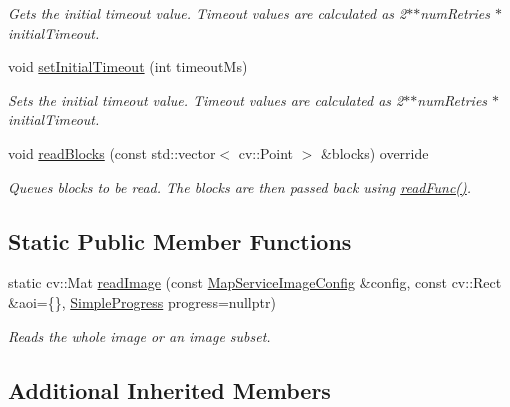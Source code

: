 \begin{DoxyCompactItemize}
\begin{DoxyCompactList}\small\item\em Gets the initial timeout value. Timeout values are calculated as 2$\ast$$\ast$num\+Retries $\ast$ initial\+Timeout. \end{DoxyCompactList}\item 
void \hyperlink{classdg_1_1deepcore_1_1imagery_1_1_map_service_image_a0335fe1cbdde4b7329edafeb29c43b1c}{set\+Initial\+Timeout} (int timeout\+Ms)
\begin{DoxyCompactList}\small\item\em Sets the initial timeout value. Timeout values are calculated as 2$\ast$$\ast$num\+Retries $\ast$ initial\+Timeout. \end{DoxyCompactList}\item 
void \hyperlink{classdg_1_1deepcore_1_1imagery_1_1_map_service_image_a54d32c97fee4bd6e4782c32beaf64fc1}{read\+Blocks} (const std\+::vector$<$ cv\+::\+Point $>$ \&blocks) override
\begin{DoxyCompactList}\small\item\em Queues blocks to be read. The blocks are then passed back using \hyperlink{classdg_1_1deepcore_1_1imagery_1_1_geo_image_a2eb4fdc320aee10e8afd337138e2e7e1}{read\+Func()}. \end{DoxyCompactList}\end{DoxyCompactItemize}
\subsection*{Static Public Member Functions}
\begin{DoxyCompactItemize}
\item 
static cv\+::\+Mat \hyperlink{classdg_1_1deepcore_1_1imagery_1_1_map_service_image_a0117186c5bcc7b9f142cd80543f6c4c1}{read\+Image} (const \hyperlink{structdg_1_1deepcore_1_1imagery_1_1_map_service_image_config}{Map\+Service\+Image\+Config} \&config, const cv\+::\+Rect \&aoi=\{\}, \hyperlink{group___utility_module_ga6763018df79e4bdbcd8cd14cea5342b2}{Simple\+Progress} progress=nullptr)
\begin{DoxyCompactList}\small\item\em Reads the whole image or an image subset. \end{DoxyCompactList}\end{DoxyCompactItemize}
\subsection*{Additional Inherited Members}


